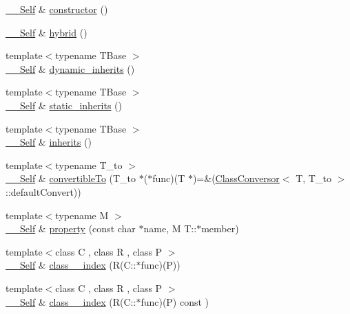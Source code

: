 \begin{DoxyCompactItemize}
\item 
\hyperlink{classSLB_1_1Class_aef6fc94f5e50c96268e669ab6946ad8b}{\+\_\+\+\_\+\+Self} \& \hyperlink{classSLB_1_1Class_aa30352fcb850b69611a2188779f82d76}{constructor} ()
\item 
\hyperlink{classSLB_1_1Class_aef6fc94f5e50c96268e669ab6946ad8b}{\+\_\+\+\_\+\+Self} \& \hyperlink{classSLB_1_1Class_af06d53e4579ac5409a08d86412d5908b}{hybrid} ()
\item 
{\footnotesize template$<$typename T\+Base $>$ }\\\hyperlink{classSLB_1_1Class_aef6fc94f5e50c96268e669ab6946ad8b}{\+\_\+\+\_\+\+Self} \& \hyperlink{classSLB_1_1Class_afca6cbe756ccfa38277e0d37d620a5bd}{dynamic\+\_\+inherits} ()
\item 
{\footnotesize template$<$typename T\+Base $>$ }\\\hyperlink{classSLB_1_1Class_aef6fc94f5e50c96268e669ab6946ad8b}{\+\_\+\+\_\+\+Self} \& \hyperlink{classSLB_1_1Class_a8abd51b84c21e5d9aea2967298e36de5}{static\+\_\+inherits} ()
\item 
{\footnotesize template$<$typename T\+Base $>$ }\\\hyperlink{classSLB_1_1Class_aef6fc94f5e50c96268e669ab6946ad8b}{\+\_\+\+\_\+\+Self} \& \hyperlink{classSLB_1_1Class_aa8fafcb3685ec668951a94725b6560ca}{inherits} ()
\item 
{\footnotesize template$<$typename T\+\_\+to $>$ }\\\hyperlink{classSLB_1_1Class_aef6fc94f5e50c96268e669ab6946ad8b}{\+\_\+\+\_\+\+Self} \& \hyperlink{classSLB_1_1Class_aa483780abd2c3ef34a14ad247d991690}{convertible\+To} (T\+\_\+to $\ast$($\ast$func)(T $\ast$)=\&(\hyperlink{structSLB_1_1ClassConversor}{Class\+Conversor}$<$ T, T\+\_\+to $>$\+::default\+Convert))
\item 
{\footnotesize template$<$typename M $>$ }\\\hyperlink{classSLB_1_1Class_aef6fc94f5e50c96268e669ab6946ad8b}{\+\_\+\+\_\+\+Self} \& \hyperlink{classSLB_1_1Class_a03e0b7e1b13f3e559381296260260ced}{property} (const char $\ast$name, M T\+::$\ast$member)
\item 
{\footnotesize template$<$class C , class R , class P $>$ }\\\hyperlink{classSLB_1_1Class_aef6fc94f5e50c96268e669ab6946ad8b}{\+\_\+\+\_\+\+Self} \& \hyperlink{classSLB_1_1Class_ab443c6dcd3320e5cb866fb4364e94622}{class\+\_\+\+\_\+index} (R(C\+::$\ast$func)(P))
\item 
{\footnotesize template$<$class C , class R , class P $>$ }\\\hyperlink{classSLB_1_1Class_aef6fc94f5e50c96268e669ab6946ad8b}{\+\_\+\+\_\+\+Self} \& \hyperlink{classSLB_1_1Class_aa8a552a153eeb97250cd1d2a3433df65}{class\+\_\+\+\_\+index} (R(C\+::$\ast$func)(P) const )

\end{DoxyCompactItemize}
